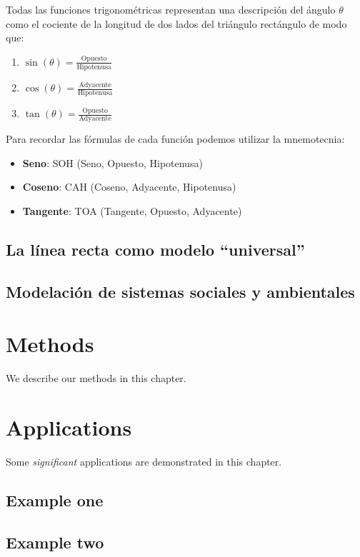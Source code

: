 \documentclass[
]{book}
\providecommand{\tightlist}{%
  \setlength{\itemsep}{0pt}\setlength{\parskip}{0pt}}
\begin{document}
Todas las funciones trigonométricas representan una descripción del ángulo \(\theta\) como el cociente de la longitud de dos lados del triángulo rectángulo de modo que:

\begin{enumerate}
\def\labelenumi{\arabic{enumi}.}
\tightlist
\item
  \(\sin(\theta) = \frac{\mathrm{Opuesto}}{\mathrm{Hipotenusa}}\)
\item
  \(\cos(\theta) = \frac{\mathrm{Adyacente}}{\mathrm{Hipotenusa}}\)
\item
  \(\tan(\theta) = \frac{\mathrm{Opuesto}}{\mathrm{Adyacente}}\)
\end{enumerate}

Para recordar las fórmulas de cada función podemos utilizar la mnemotecnia:

\begin{itemize}
\tightlist
\item
  \textbf{Seno}: SOH (Seno, Opuesto, Hipotenusa)
\item
  \textbf{Coseno}: CAH (Coseno, Adyacente, Hipotenusa)
\item
  \textbf{Tangente}: TOA (Tangente, Opuesto, Adyacente)
\end{itemize}

\hypertarget{la-luxednea-recta-como-modelo-universal}{%
\section{La línea recta como modelo ``universal''}\label{la-luxednea-recta-como-modelo-universal}}

\hypertarget{modelaciuxf3n-de-sistemas-sociales-y-ambientales}{%
\section{Modelación de sistemas sociales y ambientales}\label{modelaciuxf3n-de-sistemas-sociales-y-ambientales}}

\hypertarget{methods}{%
\chapter{Methods}\label{methods}}

We describe our methods in this chapter.

\hypertarget{applications}{%
\chapter{Applications}\label{applications}}

Some \emph{significant} applications are demonstrated in this chapter.

\hypertarget{example-one}{%
\section{Example one}\label{example-one}}

\hypertarget{example-two}{%
\section{Example two}\label{example-two}}

  
\end{document}
